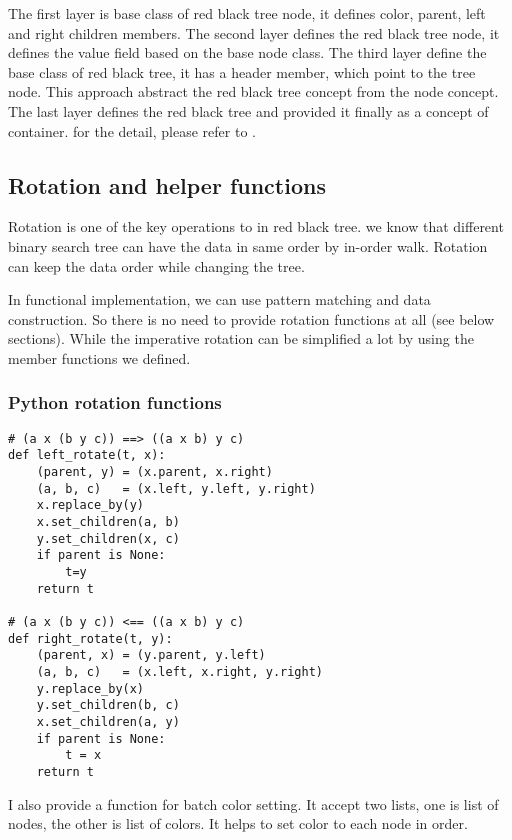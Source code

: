\documentclass{article}
\begin{document}
The first layer is base class of red black tree node, it defines
color, parent, left and right children members. The second layer
defines the red black tree node, it defines the value field based on
the base node class. The third layer define the base class of red
black tree, it has a header member, which point to the tree node.
This approach abstract the red black tree concept from the node
concept. The last layer defines the red black tree and provided it
finally as a concept of container. for the detail, please refer to \cite{sgi-stl}.

\subsection{Rotation and helper functions} \label{helper-fun}

Rotation is one of the key operations to in red black tree. we know that
different binary search tree can have the data in same order by in-order walk.
Rotation can keep the data order while changing the tree. 

In functional implementation, we can use pattern matching and data construction.
So there is no need to provide rotation functions at all (see below sections).
While the imperative rotation can be simplified a lot by using the member functions we defined.

\subsubsection*{Python rotation functions}
\lstset{language=Python}
\begin{lstlisting}
# (a x (b y c)) ==> ((a x b) y c)
def left_rotate(t, x):
    (parent, y) = (x.parent, x.right)
    (a, b, c)   = (x.left, y.left, y.right)
    x.replace_by(y)
    x.set_children(a, b)
    y.set_children(x, c)
    if parent is None:
        t=y
    return t

# (a x (b y c)) <== ((a x b) y c)
def right_rotate(t, y):
    (parent, x) = (y.parent, y.left)
    (a, b, c)   = (x.left, x.right, y.right)
    y.replace_by(x)
    y.set_children(b, c)
    x.set_children(a, y)
    if parent is None:
        t = x
    return t
\end{lstlisting}

I also provide a function for batch color setting. It accept two lists,
one is list of nodes, the other is list of colors. It helps to set color
to each node in order.
\end{document}

